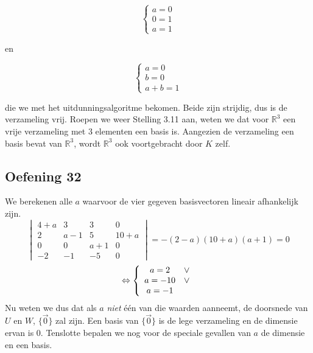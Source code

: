 \documentclass[lineaire_algebra_oplossingen.tex]{subfiles}
\begin{document}
\[
\left\{
\begin{array}{l}
a = 0\\
0 = 1\\
a = 1
\end{array} \right.
\]

en

\[
\left\{
\begin{array}{l}
a = 0\\
b = 0\\
a + b = 1
\end{array} \right.
\]

die we met het uitdunningsalgoritme bekomen. Beide zijn strijdig, dus is de verzameling vrij. Roepen we weer Stelling 3.11 aan, weten we dat voor $\mathbb{R}^3$ een vrije verzameling met 3 elementen een basis is. Aangezien de verzameling een basis bevat van $\mathbb{R}^3$, wordt $\mathbb{R}^3$ ook voortgebracht door $K$ zelf.

\subsection{Oefening 32}
We berekenen alle $a$ waarvoor de vier gegeven basisvectoren lineair afhankelijk zijn.
\[
\begin{vmatrix}
4+a & 3 & 3 & 0\\
2 & a-1 & 5 & 10+a\\
0 & 0 & a+1 & 0\\
-2 & -1 & -5 & 0
\end{vmatrix}
= -(2-a)(10+a)(a+1)=0
\]
\[
\Leftrightarrow 
\left\lbrace
\begin{array}{c c}
a = 2 &\vee\\
a = -10 &\vee\\
a = -1\\
\end{array}
\right.
\]
Nu weten we dus dat als $a$ \textit{niet} \'e\'en van die waarden aanneemt, de doorsnede van $U$ en $W$, $\{\vec{0}\}$ zal zijn. Een basis van $\{\vec{0}\}$ is de lege verzameling en de dimensie ervan is $0$.
Tenslotte bepalen we nog voor de speciale gevallen van $a$ de dimensie en een basis.
\end{document}
